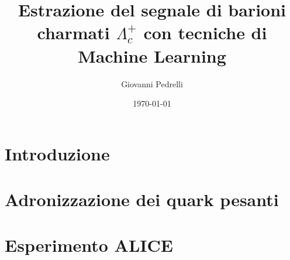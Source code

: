 \documentclass[a4paper,
               12pt,
               twoside,
               openright,
               onecolumn,
               final,
               titlepage]{book}
\title{Estrazione del segnale di barioni charmati $\Lambda^+_c$ con tecniche di Machine Learning}
\author{Giovanni Pedrelli}
\date{\today}
\begin{document}
    
    \pagestyle{fancy}

    
    \fncyfront  
    \frontmatter{}
        \pagestyle{empty}
        \begin{titlepage}
            
        \end{titlepage}
        
        
        
        \begin{abstract}
            
        \end{abstract}
    \tableofcontents


    \fncymain
    \mainmatter{}
        \pagestyle{headings}
        \chapter*{Introduzione}
        
        \chapter{Adronizzazione dei quark pesanti}
        \label{cha:1-QCD}        
        
        \chapter{Esperimento ALICE}
        \label{cha:2-ALICE}
        
\end{document}
